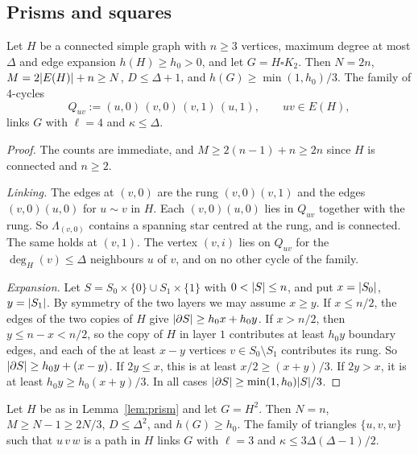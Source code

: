 \subsection{Prisms and squares}

\begin{lemma}[prisms]\label{lem:prism}
Let $H$ be a connected simple graph with $n\ge3$ vertices, maximum degree at most $\Delta$ and edge expansion $h(H)\ge h_0>0$, and let $G=H\square K_2$. Then $N=2n$, $M=2\lvert E(H)\rvert+n\ge N$, $D\le\Delta+1$, and $h(G)\ge\min(1,h_0)/3$. The family of $4$-cycles
\[
  Q_{uv}:=(u,0)\,(v,0)\,(v,1)\,(u,1),\qquad uv\in E(H),
\]
links $G$ with $\ell=4$ and $\kappa\le\Delta$.
\end{lemma}

\begin{proof}
The counts are immediate, and $M\ge2(n-1)+n\ge2n$ since $H$ is connected and $n\ge2$.

\emph{Linking.} The edges at $(v,0)$ are the rung $(v,0)(v,1)$ and the edges $(v,0)(u,0)$ for $u\sim v$ in $H$. Each $(v,0)(u,0)$ lies in $Q_{uv}$ together with the rung. So $\Lambda_{(v,0)}$ contains a spanning star centred at the rung, and is connected. The same holds at $(v,1)$. The vertex $(v,i)$ lies on $Q_{uv}$ for the $\deg_H(v)\le\Delta$ neighbours $u$ of $v$, and on no other cycle of the family.

\emph{Expansion.} Let $S=S_0\times\{0\}\cup S_1\times\{1\}$ with $0<\lvert S\rvert\le n$, and put $x=\lvert S_0\rvert$, $y=\lvert S_1\rvert$. By symmetry of the two layers we may assume $x\ge y$. If $x\le n/2$, the edges of the two copies of $H$ give $\lvert \partial S\rvert\ge h_0x+h_0y$. If $x>n/2$, then $y\le n-x<n/2$, so the copy of $H$ in layer $1$ contributes at least $h_0y$ boundary edges, and each of the at least $x-y$ vertices $v\in S_0\setminus S_1$ contributes its rung. So $\lvert \partial S\rvert\ge h_0y+(x-y)$. If $2y\le x$, this is at least $x/2\ge(x+y)/3$. If $2y>x$, it is at least $h_0y\ge h_0(x+y)/3$. In all cases $\lvert \partial S\rvert\ge\min(1,h_0)\lvert S\rvert/3$.
\end{proof}

\begin{lemma}[squares]\label{lem:square}
Let $H$ be as in Lemma~\ref{lem:prism} and let $G=H^2$. Then $N=n$, $M\ge N-1\ge2N/3$, $D\le\Delta^2$, and $h(G)\ge h_0$. The family of triangles $\{u,v,w\}$ such that $u\,v\,w$ is a path in $H$ links $G$ with $\ell=3$ and $\kappa\le3\Delta(\Delta-1)/2$.
\end{lemma}

